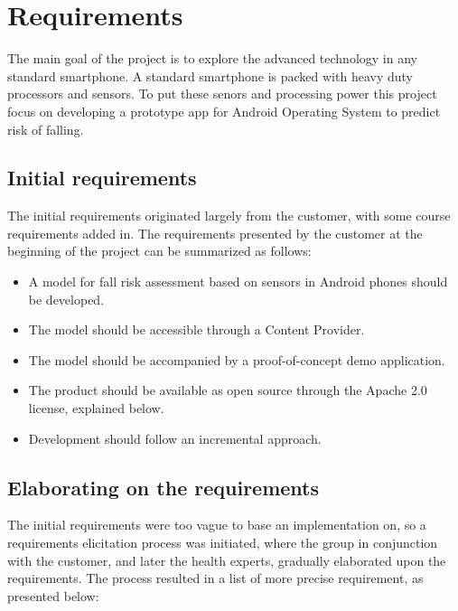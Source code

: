 \chapter{Requirements}

The main goal of the project is to explore the advanced technology in any standard smartphone. A standard smartphone is packed with heavy duty processors and sensors. To put these senors and processing power this project focus on developing a prototype app for Android Operating System to predict risk of falling. 

\section{Initial requirements}
The initial requirements originated largely from the customer, with some course requirements added in. The requirements presented by the customer at the beginning of the project can be summarized as follows:

\begin{itemize}
\item A model for fall risk assessment based on sensors in Android phones should be developed.
\item The model should be accessible through a Content Provider.
\item The model should be accompanied by a proof-of-concept demo application.
\item The product should be available as open source through the Apache 2.0 license, explained below.
\item Development should follow an incremental approach.
\end{itemize}

\section{Elaborating on the requirements}
The initial requirements were too vague to base an implementation on, so a requirements elicitation process was initiated, where the group in conjunction with the customer, and later the health experts, gradually elaborated upon the requirements. The process resulted in a list of more precise requirement, as presented below:

